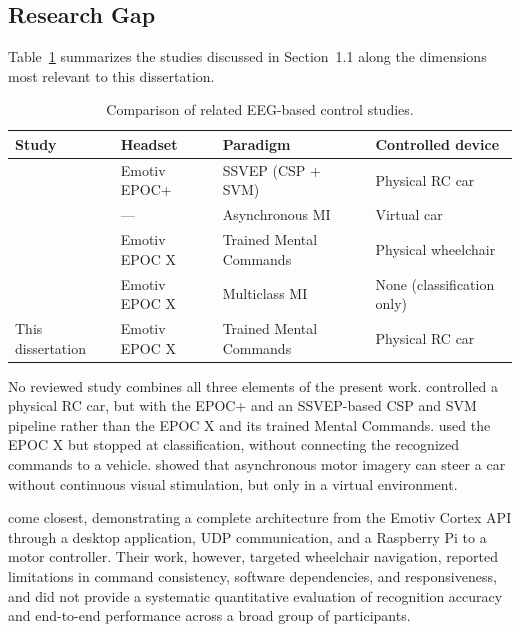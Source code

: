 \subsection{Research Gap}

Table~\ref{tab:ch1-related-work} summarizes the studies discussed in Section~1.1 along the dimensions most relevant to this dissertation.

\begin{table}[htbp]
  \centering
  \footnotesize
  \caption{Comparison of related EEG-based control studies.}
  \label{tab:ch1-related-work}
  \begin{tabular}{@{}l l p{2.6cm} p{2.4cm}@{}}
    \toprule
    \textbf{Study} & \textbf{Headset} & \textbf{Paradigm} & \textbf{Controlled device} \\
    \midrule
    \citet{setiono2018rccar}        & Emotiv EPOC+ & SSVEP (CSP + SVM)        & Physical RC car \\
    \citet{zhao2009asynchronous}    & --- & Asynchronous MI          & Virtual car \\
    \citet{stoyell2022wheelchair}   & Emotiv EPOC X & Trained Mental Commands & Physical wheelchair \\
    \citet{tarara2025}              & Emotiv EPOC X & Multiclass MI           & None (classification only) \\
    \midrule
    This dissertation               & Emotiv EPOC X & Trained Mental Commands & Physical RC car \\
    \bottomrule
  \end{tabular}
\end{table}

No reviewed study combines all three elements of the present work. \citet{setiono2018rccar} controlled a physical RC car, but with the EPOC+ and an SSVEP-based CSP and SVM pipeline rather than the EPOC X and its trained Mental Commands. \citet{tarara2025} used the EPOC X but stopped at classification, without connecting the recognized commands to a vehicle. \citet{zhao2009asynchronous} showed that asynchronous motor imagery can steer a car without continuous visual stimulation, but only in a virtual environment.

\citet{stoyell2022wheelchair} come closest, demonstrating a complete architecture from the Emotiv Cortex API through a desktop application, UDP communication, and a Raspberry Pi to a motor controller. Their work, however, targeted wheelchair navigation, reported limitations in command consistency, software dependencies, and responsiveness, and did not provide a systematic quantitative evaluation of recognition accuracy and end-to-end performance across a broad group of participants.


